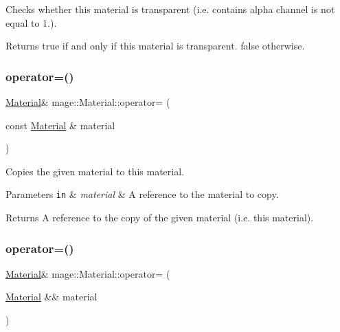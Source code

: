 Checks whether this material is transparent (i.\+e. contains alpha channel is not equal to 1.).

\begin{DoxyReturn}{Returns}
{\ttfamily true} if and only if this material is transparent. {\ttfamily false} otherwise. 
\end{DoxyReturn}
\hypertarget{structmage_1_1_material_a7ebc9986924ca13ae8468005518dcfc7}{}\label{structmage_1_1_material_a7ebc9986924ca13ae8468005518dcfc7} 
\subsubsection{\texorpdfstring{operator=()}{operator=()}\hspace{0.1cm}{\footnotesize\ttfamily [1/2]}}
{\footnotesize\ttfamily \hyperlink{structmage_1_1_material}{Material}\& mage\+::\+Material\+::operator= (\begin{DoxyParamCaption}\item[{const \hyperlink{structmage_1_1_material}{Material} \&}]{material }\end{DoxyParamCaption})\hspace{0.3cm}{\ttfamily [default]}}

Copies the given material to this material.


\begin{DoxyParams}[1]{Parameters}
\mbox{\tt in}  & {\em material} & A reference to the material to copy. \\
\hline
\end{DoxyParams}
\begin{DoxyReturn}{Returns}
A reference to the copy of the given material (i.\+e. this material). 
\end{DoxyReturn}
\hypertarget{structmage_1_1_material_a500a2ebe99d4d7b3be5bf57b6bff62a1}{}\label{structmage_1_1_material_a500a2ebe99d4d7b3be5bf57b6bff62a1} 
\subsubsection{\texorpdfstring{operator=()}{operator=()}\hspace{0.1cm}{\footnotesize\ttfamily [2/2]}}
{\footnotesize\ttfamily \hyperlink{structmage_1_1_material}{Material}\& mage\+::\+Material\+::operator= (\begin{DoxyParamCaption}\item[{\hyperlink{structmage_1_1_material}{Material} \&\&}]{material }\end{DoxyParamCaption})\hspace{0.3cm}{\ttfamily [default]}}

